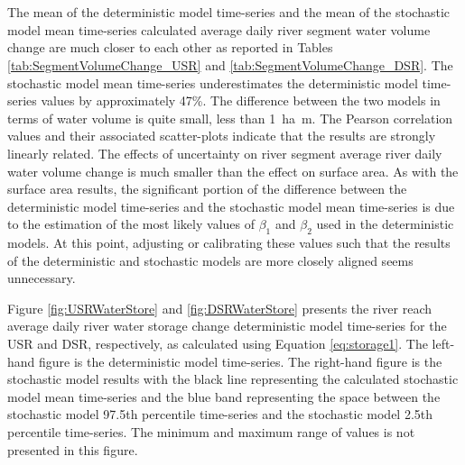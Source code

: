 \subtabletop
\begin{table}[htbp]
	\centering
	\caption[DSR river segment volume change deterministic and stochastic model numerical results.]{DSR river segment volume change deterministic and stochastic model numerical results.  Values are in hectare-meters (\si{\hectare\meter}) and the values in parentheses are in acres (\si{\acre}).}
	\label{tab:SegmentVolumeChange_DSR}
	\begin{subtable}{\textwidth}
		\centering
		
	\end{subtable}\\
	\tablevspace	
	\begin{subtable}{\textwidth}
		\centering
		
	\end{subtable}\\
\end{table}	

The mean of the deterministic model time-series and the mean of the stochastic model mean time-series calculated average daily river segment water volume change are much closer to each other as reported in Tables \ref{tab:SegmentVolumeChange_USR} and \ref{tab:SegmentVolumeChange_DSR}.  The stochastic model mean time-series underestimates the deterministic model time-series values by approximately 47\%.  The difference between the two models in terms of water volume is quite small, less than \SI{1}{\hectare\meter}.  The Pearson correlation values and their associated scatter-plots indicate that the results are strongly linearly related.  The effects of uncertainty on river segment average river daily water volume change is much smaller than the effect on surface area.  As with the surface area results, the significant portion of the difference between the deterministic model time-series and the stochastic model mean time-series is due to the estimation of the most likely values of $ \beta_1 $ and $ \beta_2 $ used in the deterministic models.  At this point, adjusting or calibrating these values such that the results of the deterministic and stochastic models are more closely aligned seems unnecessary.

Figure \ref{fig:USRWaterStore} and \ref{fig:DSRWaterStore} presents the river reach average daily river water storage change deterministic model time-series for the USR and DSR, respectively, as calculated using Equation \ref{eq:storage1}.  The left-hand figure is the deterministic model time-series.  The right-hand figure is the stochastic model results with the black line representing the calculated stochastic model mean time-series and the blue band representing the space between the stochastic model 97.5th percentile time-series and the stochastic model 2.5th percentile time-series.  The minimum and maximum range of values is not presented in this figure.

